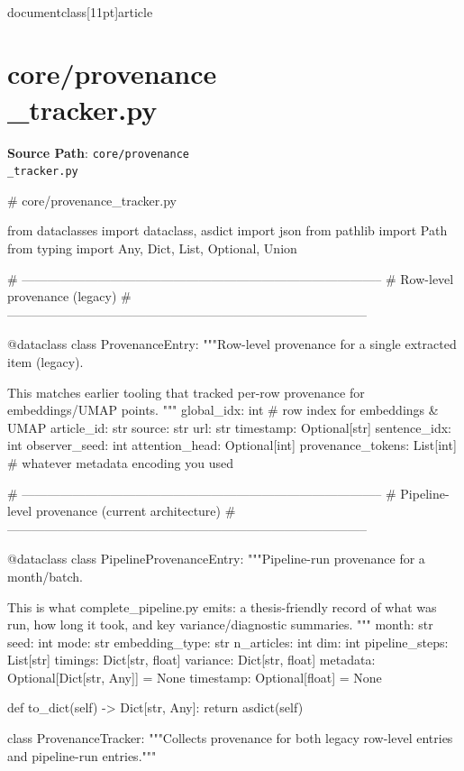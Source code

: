 \\documentclass[11pt]{article}
\begin{document}
\section*{core/provenance\\_tracker.py}
\textbf{Source Path}: \texttt{core/provenance\\_tracker.py}\par
\bigskip
\begin{CodeBlock}
# core/provenance_tracker.py

from dataclasses import dataclass, asdict
import json
from pathlib import Path
from typing import Any, Dict, List, Optional, Union


# --------------------------------------------------------------------------------------
# Row-level provenance (legacy)
# --------------------------------------------------------------------------------------

@dataclass
class ProvenanceEntry:
    """Row-level provenance for a single extracted item (legacy).

    This matches earlier tooling that tracked per-row provenance for embeddings/UMAP points.
    """
    global_idx: int                 # row index for embeddings & UMAP
    article_id: str
    source: str
    url: str
    timestamp: Optional[str]
    sentence_idx: int
    observer_seed: int
    attention_head: Optional[int]
    provenance_tokens: List[int]    # whatever metadata encoding you used


# --------------------------------------------------------------------------------------
# Pipeline-level provenance (current architecture)
# --------------------------------------------------------------------------------------

@dataclass
class PipelineProvenanceEntry:
    """Pipeline-run provenance for a month/batch.

    This is what complete_pipeline.py emits: a thesis-friendly record of what was run,
    how long it took, and key variance/diagnostic summaries.
    """
    month: str
    seed: int
    mode: str
    embedding_type: str
    n_articles: int
    dim: int
    pipeline_steps: List[str]
    timings: Dict[str, float]
    variance: Dict[str, float]
    metadata: Optional[Dict[str, Any]] = None
    timestamp: Optional[float] = None

    def to_dict(self) -> Dict[str, Any]:
        return asdict(self)


class ProvenanceTracker:
    """Collects provenance for both legacy row-level entries and pipeline-run entries."""


\end{CodeBlock}
\end{document}
